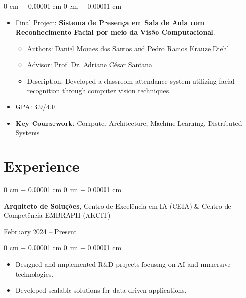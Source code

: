 \documentclass[10pt, letterpaper]{article}
\newenvironment{highlights}{
    \begin{itemize}[
        topsep=0.10 cm,
        parsep=0.10 cm,
        partopsep=0pt,
        itemsep=0pt,
        leftmargin=0 cm + 10pt
    ]
}{
    \end{itemize}
} %
\newenvironment{highlightsforbulletentries}{
    \begin{itemize}[
        topsep=0.10 cm,
        parsep=0.10 cm,
        partopsep=0pt,
        itemsep=0pt,
        leftmargin=10pt
    ]
}{
    \end{itemize}
} %
\newenvironment{onecolentry}{
    \begin{adjustwidth}{
        0 cm + 0.00001 cm
    }{
        0 cm + 0.00001 cm
    }
}{
    \end{adjustwidth}
} %
\newenvironment{twocolentry}[2][]{
    \onecolentry
    \def\secondColumn{#2}
    \setcolumnwidth{\fill, 4.5 cm}
    \begin{paracol}{2}
}{
    \switchcolumn \raggedleft \secondColumn
    \end{paracol}
    \endonecolentry
} %
\begin{document}
        \vspace{0.10 cm}
        \begin{onecolentry}
            \begin{highlights}
                \item Final Project: \textbf{Sistema de Presença em Sala de Aula com Reconhecimento Facial por meio da Visão Computacional}.
                \begin{highlightsforbulletentries}
                    \item Authors: Daniel Moraes dos Santos and Pedro Ramos Krauze Diehl
                    \item Advisor: Prof. Dr. Adriano César Santana
                    \item Description: Developed a classroom attendance system utilizing facial recognition through computer vision techniques.
                \end{highlightsforbulletentries}
                \item GPA: 3.9/4.0
                \item \textbf{Key Coursework:} Computer Architecture, Machine Learning, Distributed Systems
            \end{highlights}
        \end{onecolentry}


    \section{Experience}

        \begin{twocolentry}{
            February 2024 – Present
        }
            \textbf{Arquiteto de Soluções}, Centro de Excelência em IA (CEIA) \& Centro de Competência EMBRAPII (AKCIT)
        \end{twocolentry}
        \vspace{0.10 cm}
        \begin{onecolentry}
            \begin{highlights}
                \item Designed and implemented R\&D projects focusing on AI and immersive technologies.
                \item Developed scalable solutions for data-driven applications.
            \end{highlights}
        \end{onecolentry}

        \vspace{0.2 cm}
\end{document}

